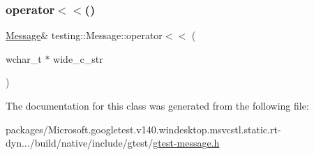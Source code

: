 \mbox{\label{classtesting_1_1_message_aae57eefb3a72a19c11453d630b1d846c}} 
\subsubsection{\texorpdfstring{operator$<$$<$()}{operator<<()}\hspace{0.1cm}{\footnotesize\ttfamily [6/6]}}
{\footnotesize\ttfamily \mbox{\hyperlink{classtesting_1_1_message}{Message}}\& testing\+::\+Message\+::operator$<$$<$ (\begin{DoxyParamCaption}\item[{wchar\+\_\+t $\ast$}]{wide\+\_\+c\+\_\+str }\end{DoxyParamCaption})}



The documentation for this class was generated from the following file\+:\begin{DoxyCompactItemize}
\item 
packages/\+Microsoft.\+googletest.\+v140.\+windesktop.\+msvcstl.\+static.\+rt-\/dyn.../build/native/include/gtest/\mbox{\hyperlink{gtest-message_8h}{gtest-\/message.\+h}}\end{DoxyCompactItemize}

